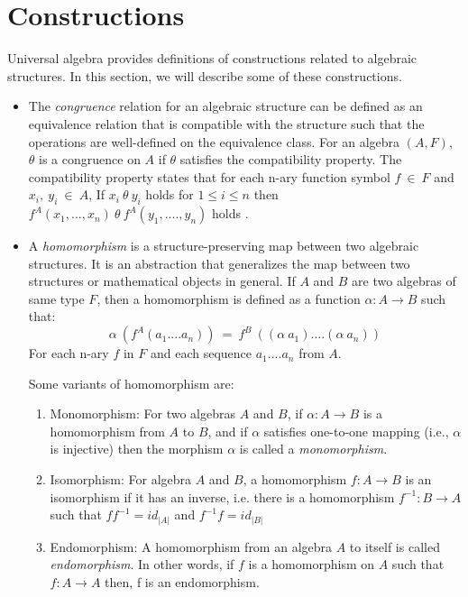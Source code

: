 \section{Constructions}
\label{construct}
Universal algebra provides definitions of constructions related to algebraic
structures. In this section, we will describe some of these constructions. 
\begin{itemize}
    \item The \textit{congruence} relation for an algebraic structure can be
    defined as an equivalence relation that is compatible with the structure
    such that the operations are well-defined on the equivalence class. For an
    algebra $(A,F)$, $\theta$ is a congruence on $A$ if $\theta$ satisfies the
    compatibility property. The compatibility property states that for each
    n-ary function symbol $f \ \in\ F$ and $x_i,\ y_i\ \in\ A$, If $x_i\ \theta\
    y_i$ holds for \(1\leq i \leq n\) then $f^{A}(x_1,...,x_n)\ \theta\
    f^{A}(y_1,....,y_n)$ holds \cite{sankappanavar1981course}.
    
    \item A \textit{homomorphism} is a structure-preserving map between two
    algebraic structures. It is an abstraction that generalizes the map between
    two structures or mathematical objects in general. If $A$ and $B$ are two
    algebras of same type $F$, then a homomorphism is defined as a function
    $\alpha: A \rightarrow B$ such that: \[ \alpha\ (f^{A}(a_1....a_n))\ =\
    f^{B}\ ((\alpha\ a_1)....(\alpha\ a_n))\] For each n-ary $f$ in $F$ and
    each sequence $a_1....a_n$ from $A$.

    Some variants of homomorphism are:
    \begin{enumerate}
        \item  Monomorphism: For two algebras $A$ and $B$, if \(\alpha : A
        \rightarrow B \) is a homomorphism from $A$ to $B$, and if \(\alpha\)
        satisfies one-to-one mapping (i.e., \(\alpha\) is injective) then the
        morphism \(\alpha\) is called a \textit{monomorphism}.

        \item Isomorphism: For algebra $A$ and $B$, a homomorphism $f:A → B$ is
        an isomorphism if it has an inverse, i.e. there is a homomorphism
        $f^{-1}:B → A$ such that $ff^{-1} =
        id_{|A|}$ and $f^{-1}f = id_{|B|}$ 

        \item Endomorphism: A homomorphism from an algebra $A$ to itself is
        called \textit{endomorphism}. In other words, if $f$ is a homomorphism on $A$
        such that $f: A \rightarrow A$ then, f is an endomorphism.


\end{enumerate}
\end{itemize}

